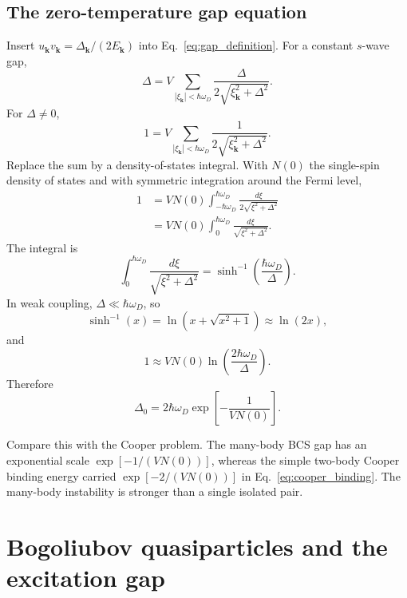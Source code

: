 \documentclass[11pt]{article}
\numberwithin{equation}{section}
\newcommand{\kvec}{\bm{k}}
\newcommand{\Deltaz}{\Delta_0}
\newcommand{\Nzero}{N(0)}
\begin{document}
\subsection{The zero-temperature gap equation}

Insert $u_{\kvec} v_{\kvec}=\Delta_{\kvec}/(2E_{\kvec})$ into Eq.~\eqref{eq:gap_definition}. For a constant $s$-wave gap,
\begin{equation}
\Delta=V\sum_{|\xi_{\kvec}|<\hbar\omega_D}\frac{\Delta}{2\sqrt{\xi_{\kvec}^2+\Delta^2}}.
\end{equation}
For $\Delta\ne 0$,
\begin{equation}
1=V\sum_{|\xi_{\kvec}|<\hbar\omega_D}\frac{1}{2\sqrt{\xi_{\kvec}^2+\Delta^2}}.
\end{equation}
Replace the sum by a density-of-states integral. With $\Nzero$ the single-spin density of states and with symmetric integration around the Fermi level,
\begin{align}
1&=V\Nzero\int_{-\hbar\omega_D}^{\hbar\omega_D}\frac{d\xi}{2\sqrt{\xi^2+\Delta^2}}\\
&=V\Nzero\int_0^{\hbar\omega_D}\frac{d\xi}{\sqrt{\xi^2+\Delta^2}}.
\end{align}
The integral is
\begin{equation}
\int_0^{\hbar\omega_D}\frac{d\xi}{\sqrt{\xi^2+\Delta^2}}
=\sinh^{-1}\left(\frac{\hbar\omega_D}{\Delta}\right).
\end{equation}
In weak coupling, $\Delta\ll\hbar\omega_D$, so
\begin{equation}
\sinh^{-1}(x)=\ln(x+\sqrt{x^2+1})\approx \ln(2x),
\end{equation}
and
\begin{equation}
1\approx V\Nzero\ln\left(\frac{2\hbar\omega_D}{\Delta}\right).
\end{equation}
Therefore
\begin{equation}
\boxed{\Deltaz=2\hbar\omega_D\exp\left[-\frac{1}{V\Nzero}\right].}
\label{eq:zero_temp_gap}
\end{equation}

Compare this with the Cooper problem. The many-body BCS gap has an exponential scale $\exp[-1/(V\Nzero)]$, whereas the simple two-body Cooper binding energy carried $\exp[-2/(V\Nzero)]$ in Eq.~\eqref{eq:cooper_binding}. The many-body instability is stronger than a single isolated pair.

\section{Bogoliubov quasiparticles and the excitation gap}
\end{document}
